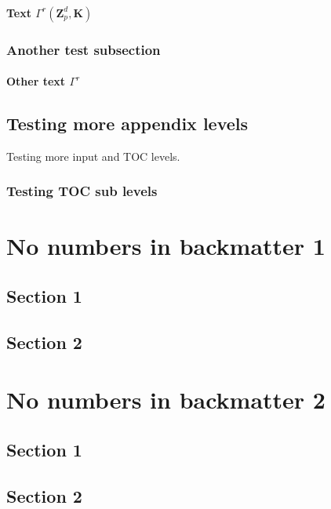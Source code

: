 \documentclass{book}
\begin{document}
\subsubsection{Text $\Gamma^{r}(\ensuremath{{\mathbf{Z}}}_p^d,\mathbf{K})$}

\subsection{Another test subsection}

\subsubsection{Other text $\Gamma^{r}$}

\section{Testing more appendix levels}
Testing more input and TOC levels.

\subsection{Testing TOC sub levels}


\backmatter

\chapter{No numbers in backmatter 1}

\section{Section 1}

\section{Section 2}

\chapter{No numbers in backmatter 2}

\section{Section 1}

\section{Section 2}
\end{document}
